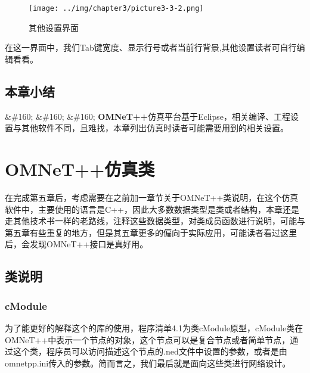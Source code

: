 \begin{figure}[htbp]
\centering
\texttt{[image: ../img/chapter3/picture3-3-2.png]}
\caption{其他设置界面}
\end{figure}

在这一界面中，我们Tab键宽度、显示行号或者当前行背景,其他设置读者可自行编辑看看。

\section{本章小结}
\label{本章小结}

\&\#160; \&\#160; \&\#160; \textbf{OMNeT++}仿真平台基于Eclipse，相关编译、工程设置与其他软件不同，且难找，本章列出仿真时读者可能需要用到的相关设置。

\chapter{OMNeT++仿真类}
\label{omnet仿真类}

在完成第五章后，考虑需要在之前加一章节关于OMNeT++类说明，在这个仿真软件中，主要使用的语言是C++，因此大多数数据类型是类或者结构，本章还是走其他技术书一样的老路线，注释这些数据类型，对类成员函数进行说明，可能与第五章有些重复的地方，但是其五章更多的偏向于实际应用，可能读者看过这里后，会发现OMNeT++接口是真好用。

\section{类说明}
\label{类说明}

\subsection{cModule}
\label{cmodule}

为了能更好的解释这个的库的使用，程序清单4.1为类cModule原型，cModule类在OMNeT++中表示一个节点的对象，这个节点可以是复合节点或者简单节点，通过这个类，程序员可以访问描述这个节点的.ned文件中设置的参数，或者是由omnetpp.ini传入的参数。简而言之，我们最后就是面向这些类进行网络设计。

